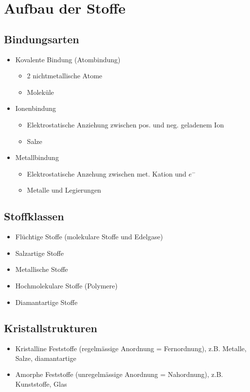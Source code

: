\section{Aufbau der Stoffe}

\subsection{Bindungsarten}
\begin{itemize}
	\item Kovalente Bindung (Atombindung)
		\begin{itemize}
			\item 2 nichtmetallische Atome
			\item Moleküle
		\end{itemize}
	\item Ionenbindung
		\begin{itemize}
			\item Elektrostatische Anziehung zwischen pos. und neg. geladenem Ion
			\item Salze
		\end{itemize}
	\item Metallbindung
		\begin{itemize}
			\item Elektrostatische Anzehung zwischen met. Kation und $e^-$
			\item Metalle und Legierungen
		\end{itemize}
\end{itemize}

\subsection{Stoffklassen}
\begin{itemize}
	\item Flüchtige Stoffe (molekulare Stoffe und Edelgase)
	\item Salzartige Stoffe
	\item Metallische Stoffe
	\item Hochmolekulare Stoffe (Polymere)
	\item Diamantartige Stoffe
\end{itemize}

\subsection{Kristallstrukturen}
\begin{itemize}
	\item Kristalline Feststoffe (regelmässige Anordnung = Fernordnung), z.B. Metalle, Salze, diamantartige
	\item Amorphe Feststoffe (unregelmässige Anordnung = Nahordnung), z.B. Kunststoffe, Glas
\end{itemize}

